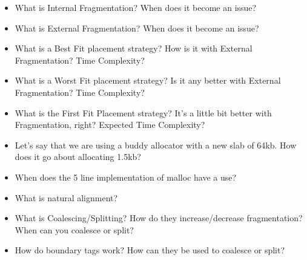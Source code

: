 \begin{itemize}
\tightlist
\item
  What is Internal Fragmentation? When does it become an issue?
\item
  What is External Fragmentation? When does it become an issue?
\item
  What is a Best Fit placement strategy? How is it with External Fragmentation? Time Complexity?
\item
  What is a Worst Fit placement strategy? Is it any better with External Fragmentation? Time Complexity?
\item
  What is the First Fit Placement strategy? It's a little bit better with Fragmentation, right? Expected Time Complexity?
\item
  Let's say that we are using a buddy allocator with a new slab of 64kb. How does it go about allocating 1.5kb?
\item
  When does the 5 line  implementation of malloc have a use?
\item
  What is natural alignment?
\item
  What is Coalescing/Splitting? How do they increase/decrease fragmentation? When can you coalesce or split?
\item
  How do boundary tags work? How can they be used to coalesce or split?
\end{itemize}



